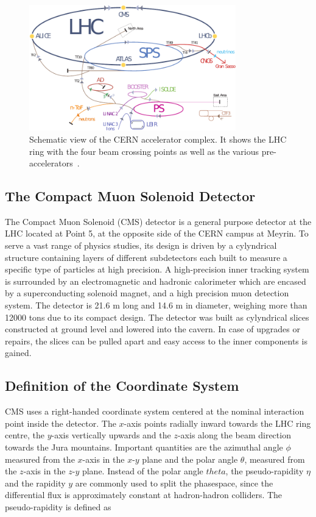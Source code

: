 \begin{figure}[htb]
    \centering
    \includegraphics[width=0.8\textwidth]{figures/cms_detector/lhc_accelerator_chain.pdf}
    \caption[CERN accelerator complex]{Schematic view of the CERN
        accelerator complex. It shows the LHC ring  with the four beam crossing
        points as well as the various pre-accelerators~\cite{LHC:COMPLEX}.}
        \label{fig:lhc_complex}
\end{figure}

\subsection{The Compact Muon Solenoid Detector}

The Compact Muon Solenoid (CMS) detector is a general purpose detector at the
LHC located at Point 5, at the opposite side of the CERN campus at Meyrin. To
serve a vast range of physics studies, its design is driven by a cylyndrical
structure containing layers of different subdetectors each built
to measure a specific type of particles at high precision. A high-precision
inner tracking system is surrounded by an electromagnetic and hadronic
calorimeter which are encased by a superconducting solenoid magnet, and a high
precision muon detection system. The detector is 21.6 m long and 14.6 m in
diameter, weighing more than 12000 tons due to its compact design. The detector
was built as cylyndrical slices constructed at ground level and lowered into the
cavern. In case of upgrades or repairs, the slices can be pulled apart and easy
access to the inner components is gained. 

\subsection{Definition of the Coordinate System}

CMS uses a right-handed coordinate system centered at the nominal interaction point inside the
detector. The $x$-axis points radially inward towards the LHC ring centre, the
$y$-axis vertically upwards and the $z$-axis along the beam direction towards
the Jura mountains. Important quantities are the azimuthal angle $\phi$
measured from the $x$-axis in the $x$-$y$ plane and the polar angle $\theta$,
measured from the $z$-axis in the $z$-$y$ plane. Instead of the polar angle
$theta$, the pseudo-rapidity $\eta$ and the rapidity $y$ are commonly used to
split the phasespace, since the differential flux is approximately constant at
hadron-hadron colliders. The pseudo-rapidity is defined as

